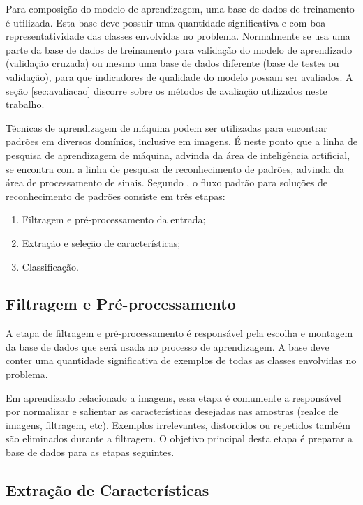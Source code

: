 Para composição do modelo de aprendizagem, uma base de dados de treinamento é utilizada. Esta base deve possuir uma quantidade significativa e com boa representatividade das classes envolvidas no problema. Normalmente se usa uma parte da base de dados de treinamento para validação do modelo de aprendizado (validação cruzada) ou mesmo uma base de dados diferente (base de testes ou validação), para que indicadores de qualidade do modelo possam ser avaliados. A seção \ref{sec:avaliacao} discorre sobre os métodos de avaliação utilizados neste trabalho.

Técnicas de aprendizagem de máquina podem ser utilizadas para encontrar padrões em diversos domínios, inclusive em imagens. É neste ponto que a linha de pesquisa de aprendizagem de máquina, advinda da área de inteligência artificial, se encontra com a linha de pesquisa de reconhecimento de padrões, advinda da área de processamento de sinais. Segundo , o fluxo padrão para soluções de reconhecimento de padrões consiste em três etapas:

\begin{enumerate}
    \item Filtragem e pré-processamento da entrada;
    \item Extração e seleção de características;
    \item Classificação.
\end{enumerate}


\subsection{Filtragem e Pré-processamento}

A etapa de filtragem e pré-processamento é responsável pela escolha e montagem da base de dados que será usada no processo de aprendizagem. A base deve conter uma quantidade significativa de exemplos de todas as classes envolvidas no problema.

Em aprendizado relacionado a imagens, essa etapa é comumente a responsável por normalizar e salientar as características desejadas nas amostras (realce de imagens, filtragem, etc). Exemplos irrelevantes, distorcidos ou repetidos também são eliminados durante a filtragem. O objetivo principal desta etapa é preparar a base de dados para as etapas seguintes.


\subsection{Extração de Características}

